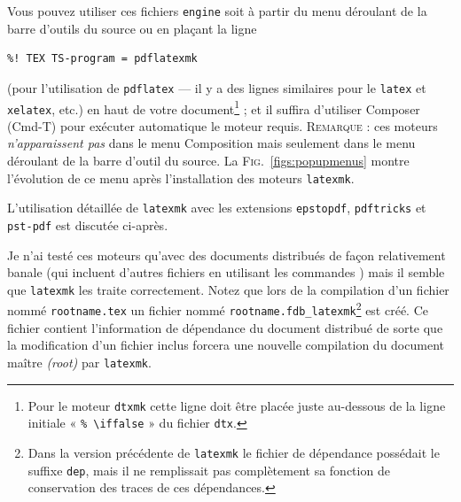 \documentclass[11pt,french]{article}
\newcommand{\cmdkey}{\textsf{Cmd}}
\newcommand{\mnu}[1]{\textsf{#1}}
\newcommand{\cmd}[1]{\textsf{#1}}
\begin{document}
Vous pouvez utiliser ces fichiers \texttt{engine} soit à partir du menu déroulant de la barre d'outils du source ou en plaçant la ligne
\begin{verbatim}
%! TEX TS-program = pdflatexmk
\end{verbatim}
(pour l'utilisation de \texttt{pdflatex} --- il y a des lignes similaires pour le \texttt{latex} et \texttt{xelatex}, etc.) en haut de votre document\footnote{Pour le moteur \texttt{dtxmk} cette ligne doit être placée juste au-dessous de la ligne initiale « \texttt{\% \textbackslash iffalse} » du fichier \texttt{dtx}.} ; et il suffira d'utiliser \mnu{Composer} (\cmdkey-\cmd{T}) pour exécuter automatique le moteur requis. \textsc{Remarque} : ces moteurs \emph{n'apparaissent pas} dans le menu \mnu{Composition} mais seulement dans le menu déroulant de la barre d'outil du source. La \textsc{Fig.}~\ref{figs:popupmenus} montre l'évolution de ce menu après l'installation des moteurs \texttt{latexmk}.

L'utilisation détaillée de \texttt{latexmk} avec les extensions \texttt{epstopdf}, \texttt{pdftricks} et \texttt{pst-pdf} est discutée ci-après.

Je n'ai testé ces moteurs qu'avec des documents distribués de façon relativement banale (qui incluent d'autres fichiers en utilisant les commandes \verb||) mais il semble que \texttt{latexmk} les traite correctement. Notez que lors de la compilation d'un fichier nommé \texttt{rootname.tex} un fichier nommé \texttt{rootname.fdb\_latexmk}\footnote{Dans la version précédente de \texttt{latexmk} le fichier de dépendance possédait le suffixe \texttt{dep},  mais il ne remplissait pas complètement sa fonction de conservation des traces de ces dépendances.} est créé. Ce fichier contient l'information de dépendance du document distribué de sorte que la modification d'un fichier inclus forcera une nouvelle compilation du document maître \emph{(root)} par \texttt{latexmk}.
\end{document}
